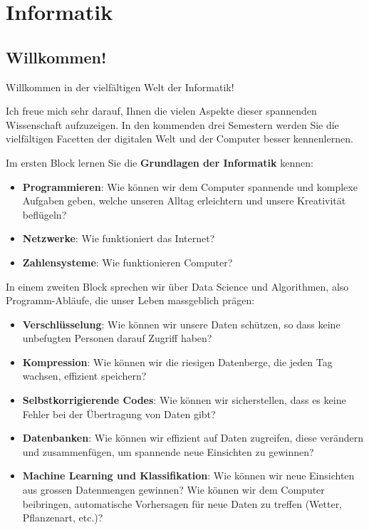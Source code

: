 \section*{Informatik}

\subsection*{Willkommen!}
Willkommen in der vielfältigen Welt der Informatik!  

Ich freue mich sehr darauf, Ihnen die vielen Aspekte dieser spannenden Wissenschaft aufzuzeigen. In den kommenden drei Semestern werden Sie die vielfältigen Facetten der digitalen Welt und der Computer besser kennenlernen. 

Im ersten Block lernen Sie die \textbf{Grundlagen der Informatik} kennen:
\begin{itemize}
\item \textbf{Programmieren}: Wie können wir dem Computer spannende und komplexe Aufgaben geben, welche unseren Alltag erleichtern und unsere Kreativität beflügeln?
\item \textbf{Netzwerke}: Wie funktioniert das Internet?
\item \textbf{Zahlensysteme}: Wie funktionieren Computer? 
\end{itemize}

In einem zweiten Block sprechen wir über Data Science und Algorithmen, also Programm-Abläufe, die unser Leben massgeblich prägen:
\begin{itemize}
\item \textbf{Verschlüsselung}: Wie können wir unsere Daten schützen, so dass keine unbefugten Personen darauf Zugriff haben?
\item \textbf{Kompression}: Wie können wir die riesigen Datenberge, die jeden Tag wachsen, effizient speichern?
\item \textbf{Selbstkorrigierende Codes}: Wie können wir sicherstellen, dass es keine Fehler bei der Übertragung von Daten gibt?
\item \textbf{Datenbanken}: Wie können wir effizient auf Daten zugreifen, diese verändern und zusammenfügen, um spannende neue Einsichten zu gewinnen?
\item \textbf{Machine Learning und Klassifikation}: Wie können wir neue Einsichten aus grossen Datenmengen gewinnen? Wie können wir dem Computer beibringen, automatische Vorhersagen für neue Daten zu treffen (Wetter, Pflanzenart, etc.)?
\end{itemize}

